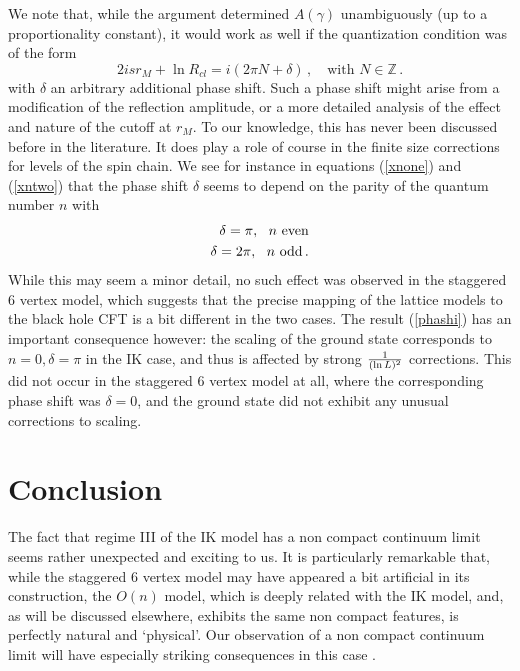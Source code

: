 \documentclass[11pt]{article}
\begin{document}
We note that, while the argument determined $A(\gamma)$ unambiguously (up to a proportionality constant), it would work as well if the quantization condition was of the form 
%
\begin{equation}
2isr_M+\ln R_{cl} =i(2\pi N+\delta) \,, \quad \mbox{with } N \in \mathbb{Z} \,.
\end{equation}
%
with $\delta$ an arbitrary additional phase shift. Such a phase shift might arise from a modification of the reflection amplitude, or a more detailed analysis of the effect and nature of the cutoff at $r_M$. To our knowledge, this has never been discussed before in the literature. It does play a role of course in the finite size corrections for levels of the spin chain. We see for instance in equations (\ref{xnone}) and (\ref{xntwo}) that the phase shift $\delta$ seems to depend on the parity of the quantum number $n$ with 
%
\begin{eqnarray}
\delta=\pi, ~~n\hbox{ even}\nonumber\\
\delta=2\pi,~~n\hbox{ odd} \,.
\label{phashi}
\end{eqnarray}
%
While this may seem a minor detail, no such effect was observed in the staggered 6 vertex model, which suggests that the precise mapping of the lattice models to the black hole CFT is a bit different in the two cases. The result (\ref{phashi}) has an important consequence however: the scaling of the ground state corresponds to $n=0,\delta=\pi$ in the IK case, and thus is affected by strong ${1\over( \ln L)^2}$ corrections. This did not occur in the staggered 6 vertex model at all, where the corresponding phase shift was $\delta=0$, and the ground state did not exhibit any unusual corrections to scaling.

\section{Conclusion}


The fact that regime III of the IK model has a non compact continuum limit seems rather unexpected and exciting to us. It is particularly remarkable that, while the staggered 6 vertex model may have appeared a bit artificial in its construction, the $O(n)$ model, which is deeply related with the IK model, and, as will be discussed elsewhere, exhibits the same non compact features, is perfectly natural and `physical'. Our observation of a non compact continuum limit will have especially striking consequences in this case \cite{VJS2}. 
\end{document}
